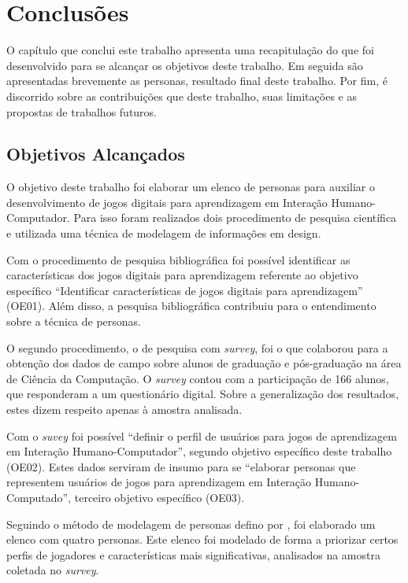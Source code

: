 
\chapter{Conclusões}
\label{chap:cons}

O capítulo que conclui este trabalho apresenta uma recapitulação do que foi desenvolvido para se alcançar os objetivos deste trabalho. Em seguida são apresentadas brevemente as personas, resultado final deste trabalho. Por fim, é discorrido sobre as contribuições que deste trabalho, suas limitações e as propostas de trabalhos futuros.


\section{Objetivos Alcançados}
O objetivo deste trabalho foi elaborar um elenco de personas para auxiliar o desenvolvimento de jogos digitais para aprendizagem em Interação Humano-Computador. Para isso foram realizados dois procedimento de pesquisa científica e utilizada uma técnica de modelagem de informações em design.

Com o procedimento de pesquisa bibliográfica foi possível identificar as características dos jogos digitais para aprendizagem referente ao objetivo específico ``Identificar características de jogos digitais para aprendizagem'' (OE01). Além disso, a pesquisa bibliográfica contribuiu para o entendimento sobre a técnica de personas.

O segundo procedimento, o de pesquisa com \textit{survey}, foi o que colaborou para a obtenção dos dados de campo sobre alunos de graduação e pós-graduação na área de Ciência da Computação. O \textit{survey} contou com a participação de 166 alunos, que responderam a um questionário digital. Sobre a generalização dos resultados, estes dizem respeito apenas à amostra analisada.

Com o \textit{suvey} foi possível ``definir o perfil de usuários para jogos de aprendizagem em Interação Humano-Computador'', segundo objetivo específico deste trabalho (OE02). Estes dados serviram de insumo para se ``elaborar personas que representem usuários de jogos para aprendizagem em Interação Humano-Computado'', terceiro objetivo específico (OE03). 

Seguindo o método de modelagem de personas defino por , foi elaborado um elenco com quatro personas. Este elenco foi modelado de forma a priorizar certos perfis de jogadores e características mais significativas, analisados na amostra coletada no \textit{survey}.

